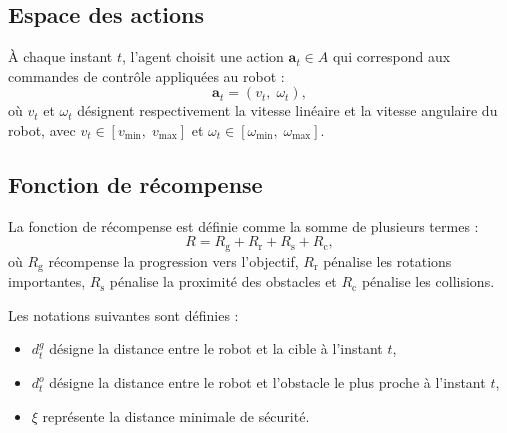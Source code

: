 

\subsection{Espace des actions}

\noindent À chaque instant $t$, l'agent choisit une action $\mathbf{a}_t \in A$ qui correspond aux commandes de contrôle appliquées au robot :
$$
    \mathbf{a}_t = (v_t, \; \omega_t),
$$
\noindent où $v_t$ et $\omega_t$ désignent respectivement la vitesse linéaire et la vitesse angulaire du robot, avec $v_t \in [v_\text{min}, \; v_\text{max}]$ et $\omega_t \in [\omega_\text{min}, \; \omega_\text{max}]$.



\subsection{Fonction de récompense}

\noindent La fonction de récompense est définie comme la somme de plusieurs termes :
$$
    R = R_{\text{g}} + R_{\text{r}} + R_{\text{s}} + R_{\text{c}},
$$
\noindent où $R_{\text{g}}$ récompense la progression vers l'objectif, $R_{\text{r}}$ pénalise les rotations importantes, $R_{\text{s}}$ pénalise la proximité des obstacles et $R_{\text{c}}$ pénalise les collisions.

\vspace{10pt}

\noindent Les notations suivantes sont définies :

\vspace{10pt}

\begin{itemize}
    \item $d^g_t$ désigne la distance entre le robot et la cible à l'instant $t$,

    \item $d^o_t$ désigne la distance entre le robot et l'obstacle le plus proche à l'instant $t$,

    \item $\xi$ représente la distance minimale de sécurité.
\end{itemize}

